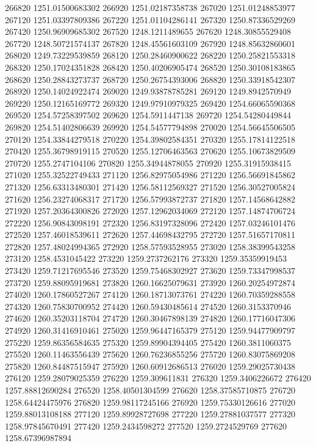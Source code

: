 {266820 1251.01500683302
266920 1251.02187358738
267020 1251.01248853977
267120 1251.03397809386
267220 1251.01104286141
267320 1250.87336529269
267420 1250.96909685302
267520 1248.1211489655
267620 1248.30855529408
267720 1248.50721574137
267820 1248.45561603109
267920 1248.85632860601
268020 1249.73229539859
268120 1250.28460900622
268220 1250.25821553318
268320 1250.17024351828
268420 1250.40206905474
268520 1250.30108183865
268620 1250.28843273737
268720 1250.26754393006
268820 1250.33918542307
268920 1250.14024922474
269020 1249.93878785281
269120 1249.8942570949
269220 1250.12165169772
269320 1249.97910979325
269420 1254.66065590368
269520 1254.57258397502
269620 1254.5911447138
269720 1254.54280449844
269820 1254.51402806639
269920 1254.54577794898
270020 1254.56645506505
270120 1254.33844279518
270220 1254.39802584351
270320 1255.17814122518
270420 1255.36798919115
270520 1255.12706463563
270620 1255.10673829509
270720 1255.2747104106
270820 1255.34944878055
270920 1255.31915938415
271020 1255.32522749433
271120 1256.82975054986
271220 1256.56691845862
271320 1256.63313480301
271420 1256.58112569327
271520 1256.30527005824
271620 1256.23274068317
271720 1256.57993872737
271820 1257.14568642882
271920 1257.20364300826
272020 1257.12962034069
272120 1257.14874706724
272220 1256.90843098191
272320 1256.83197328096
272420 1257.03246101476
272520 1257.46018539611
272620 1257.44698432795
272720 1257.51657170811
272820 1257.48024994365
272920 1258.57593528955
273020 1258.38399543258
273120 1258.4531045422
273220 1259.2737262176
273320 1259.35359919453
273420 1259.71217695546
273520 1259.75468302927
273620 1259.73347998537
273720 1259.88095919681
273820 1260.16625079631
273920 1260.20254972874
274020 1260.17860527267
274120 1260.18713073761
274220 1260.70359288558
274320 1260.75830700952
274420 1260.59430485614
274520 1260.3153370946
274620 1260.35203118704
274720 1260.30467898139
274820 1260.17716047306
274920 1260.31416910461
275020 1259.96447165379
275120 1259.94477909797
275220 1259.86356584635
275320 1259.89904394405
275420 1260.3811060375
275520 1260.11463556439
275620 1260.76236855256
275720 1260.83075869208
275820 1260.84487515947
275920 1260.60912686513
276020 1259.29025730438
276120 1259.28079025359
276220 1259.309611831
276320 1259.3406226672
276420 1257.88812690284
276520 1258.40501304599
276620 1258.37585710875
276720 1258.64424475976
276820 1259.98117245166
276920 1259.75330126616
277020 1259.88013108188
277120 1259.89928727698
277220 1259.27881037577
277320 1258.97845670491
277420 1259.2434598272
277520 1259.2724529769
277620 1258.67396987894
}
